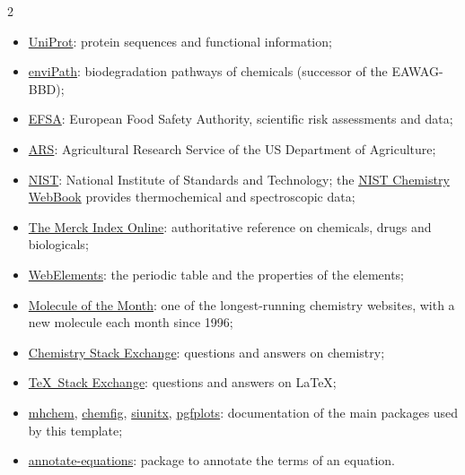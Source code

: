 \begin{footnotesize}
\begin{multicols}{2}
\begin{itemize}
            \item \href{https://www.uniprot.org/}{UniProt}: protein sequences and functional information;
            \item \href{https://enviPath.org/}{enviPath}: biodegradation pathways of chemicals (successor of the EAWAG-BBD);
            \item \href{https://www.efsa.europa.eu/}{EFSA}: European Food Safety Authority, scientific risk assessments and data;
            \item \href{https://www.ars.usda.gov/}{ARS}: Agricultural Research Service of the US Department of Agriculture;
            \item \href{https://www.nist.gov/}{NIST}: National Institute of Standards and Technology; the \href{https://webbook.nist.gov/chemistry/}{NIST Chemistry WebBook} provides thermochemical and spectroscopic data;
            \item \href{https://www.rsc.org/merck-index}{The Merck Index Online}: authoritative reference on chemicals, drugs and biologicals;
            \item \href{https://www.webelements.com/}{WebElements}: the periodic table and the properties of the elements;
            \item \href{https://www.chm.bris.ac.uk/motm/motm.htm}{Molecule of the Month}: one of the longest-running chemistry websites, with a new molecule each month since 1996;
            \item \href{https://chemistry.stackexchange.com/}{Chemistry Stack Exchange}: questions and answers on chemistry;
            \item \href{https://tex.stackexchange.com/}{\TeX\ Stack Exchange}: questions and answers on \LaTeX;
            \item \href{https://ctan.org/pkg/mhchem}{mhchem}, \href{https://ctan.org/pkg/chemfig}{chemfig}, \href{https://ctan.org/pkg/siunitx}{siunitx}, \href{https://ctan.org/pkg/pgfplots}{pgfplots}: documentation of the main packages used by this template;
            \item \href{https://ctan.org/pkg/annotate-equations}{annotate-equations}: package to annotate the terms of an equation.
        \end{itemize}
    \end{multicols}
\end{footnotesize}
